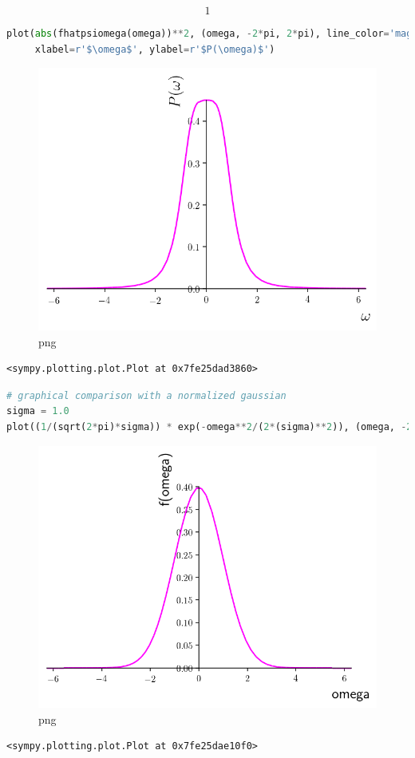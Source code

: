 \[1\]

\begin{lstlisting}[language=Python]
plot(abs(fhatpsiomega(omega))**2, (omega, -2*pi, 2*pi), line_color='magenta', 
     xlabel=r'$\omega$', ylabel=r'$P(\omega)$')
\end{lstlisting}

\begin{figure}
\centering
\includegraphics[width=0.6\linewidth]{output_64_0.png}
\caption{png}
\end{figure}

\begin{lstlisting}
<sympy.plotting.plot.Plot at 0x7fe25dad3860>
\end{lstlisting}

\begin{lstlisting}[language=Python]
# graphical comparison with a normalized gaussian
sigma = 1.0
plot((1/(sqrt(2*pi)*sigma)) * exp(-omega**2/(2*(sigma)**2)), (omega, -2*pi, 2*pi), line_color='magenta')
\end{lstlisting}

\begin{figure}
\centering
\includegraphics[width=0.6\linewidth]{output_65_0.png}
\caption{png}
\end{figure}

\begin{lstlisting}
<sympy.plotting.plot.Plot at 0x7fe25dae10f0>
\end{lstlisting}

